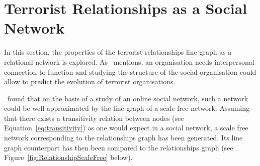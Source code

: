 \section{Terrorist Relationships as a Social Network}
\label{sec:Terrorist Relationships as a Social Network}
In this section, the properties of the terrorist relationships line graph as a relational network is explored. As~\cite{ZSG2006} mentions, an organisation needs interpersonal connection to function and studying the structure of the social organisation could allow to predict the evolution of terrorist organisations.

\cite{krawczyk_line_2011}~found that on the basis of a study of an online social network, such a network could be well approximated by the line graph of a scale free network. Assuming that there exists a transitivity relation between nodes (see Equation~\ref{eq:transitivity}) as one would expect in a social network, a scale free network corresponding to the relationships graph has been generated. Its line graph counterpart has then been compared to the relationships graph (see Figure~\ref{fig:RelationshipScaleFree} below).
%
%

